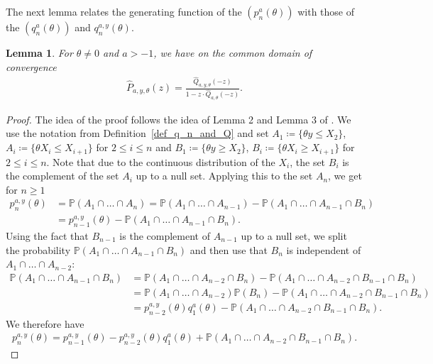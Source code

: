 \documentclass[12pt]{article}
\renewcommand{\P}{\mathbb{P}} %
\newcommand{\1}{\mathds{1}}
\theoremstyle{definition}
\theoremstyle{plain}
\newtheorem{Lemma}[definition]{Lemma}
\theoremstyle{remark}
\begin{document}
The next lemma relates the generating function of the $(p_n^a(\theta))$ with those of the $(q_n^a(\theta))$ and $q_n^{a,y}(\theta)$.
\begin{Lemma}\label{zusammenhang_genfct_yellow_p_und_q}
  For $\theta\neq 0$ and $a>-1$, we have on the common domain of convergence    \begin{align}\label{eq_zusammenhang_genfct_yellow_p_und_q}
        \hat{P}_{a,y,\theta}(z)=\frac{\hat{Q}_{a,y,\theta}(-z)}{1-z\cdot\hat{Q}_{a,\theta}(-z)}.
    \end{align}
    \end{Lemma}
    \begin{proof}
        The idea of the proof follows the idea of Lemma 2 and Lemma 3 of \cite{AurzadaRaschel}. We use the notation from Definition~\ref{def_q_n_and_Q} and set $A_1\coloneqq\{\theta y\leq X_2\}$, $A_i\coloneqq\{\theta X_i\leq X_{i+1}\}$ for $2\le i\le n$ and $B_1\coloneqq\{\theta y\geq X_2\}$, $B_i\coloneqq\{\theta X_i\geq X_{i+1}\}$ for $2\leq i \leq n$. Note that due to the continuous distribution of the $X_i$, the set $B_i$ is the complement of the set $A_i$ up to a null set. Applying this to the set $A_n$, we get for $n\geq 1$
        \begin{align*}
            p_n^{a,y}(\theta)
            &=\P(A_1\cap\dots\cap A_n)
           =\P(A_1\cap\dots\cap A_{n-1})-\P(A_1\cap\dots\cap A_{n-1}\cap B_n)
            \\&=p_{n-1}^{a,y}(\theta)-\P(A_1\cap\dots\cap A_{n-1}\cap B_n).
        \end{align*}
        Using the fact that $B_{n-1}$ is the complement of $A_{n-1}$ up to a null set, we  split the probability $\P(A_1\cap\dots\cap A_{n-1}\cap B_n)$ and then use that $B_n$ is independent of  $A_1\cap\dots \cap A_{n-2}$:
        \begin{align*}
            \P(A_1\cap\dots\cap A_{n-1}\cap B_n)
            &=\P(A_1\cap\dots\cap A_{n-2}\cap B_n)-\P(A_1\cap\dots\cap A_{n-2}\cap B_{n-1}\cap B_n)
            \\&=\P(A_1\cap\dots\cap A_{n-2})\P( B_n)-\P(A_1\cap\dots\cap A_{n-2}\cap B_{n-1}\cap B_n)
            \\&=p_{n-2}^{a,y}(\theta)q_1^a(\theta)-\P(A_1\cap\dots\cap A_{n-2}\cap B_{n-1}\cap B_n).
        \end{align*}
        We therefore have
        \begin{align*}
            p_n^{a,y}(\theta)=p_{n-1}^{a,y}(\theta)-p_{n-2}^{a,y}(\theta)q_1^a(\theta)+\P(A_1\cap\dots\cap A_{n-2}\cap B_{n-1}\cap B_n).

\end{align*}
\end{proof}
\end{document}
